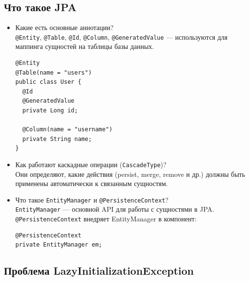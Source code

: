 \documentclass[a4paper,14pt]{article}
\begin{document}
\subsection{Что такое JPA}

\begin{itemize}
\item Какие есть основные аннотации? \\
\texttt{@Entity}, \texttt{@Table}, \texttt{@Id}, \texttt{@Column}, \texttt{@GeneratedValue} — используются для маппинга сущностей на таблицы базы данных.
\begin{lstlisting}[style=javastyle]
@Entity
@Table(name = "users")
public class User {
  @Id
  @GeneratedValue
  private Long id;

  @Column(name = "username")
  private String name;
}
\end{lstlisting}

\item Как работают каскадные операции (\texttt{CascadeType})? \\
Они определяют, какие действия (persist, merge, remove и др.) должны быть применены автоматически к связанным сущностям.

\item Что такое \texttt{EntityManager} и \texttt{@PersistenceContext}? \\
\texttt{EntityManager} — основной API для работы с сущностями в JPA. \\
\texttt{@PersistenceContext} внедряет EntityManager в компонент:
\begin{lstlisting}[style=javastyle]
@PersistenceContext
private EntityManager em;
\end{lstlisting}
\end{itemize}

\subsection{Проблема LazyInitializationException}
\end{document}
